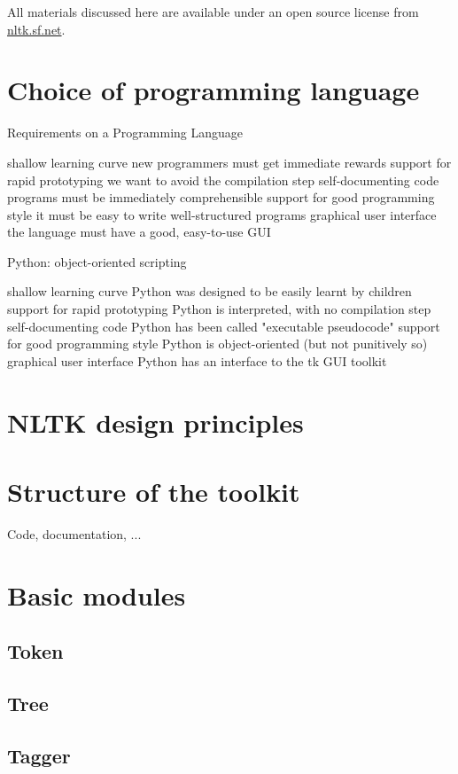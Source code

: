 \documentclass[11pt]{article}
\begin{document}
All materials discussed here are available under an open
source license from \url{nltk.sf.net}.

\section{Choice of programming language}

Requirements on a Programming Language

shallow learning curve
new programmers must get immediate rewards
support for rapid prototyping
we want to avoid the compilation step
self-documenting code
programs must be immediately comprehensible
support for good programming style
it must be easy to write well-structured programs
graphical user interface
the language must have a good, easy-to-use GUI

Python: object-oriented scripting

shallow learning curve
Python was designed to be easily learnt by children
support for rapid prototyping
Python is interpreted, with no compilation step
self-documenting code
Python has been called "executable pseudocode"
support for good programming style
Python is object-oriented (but not punitively so)
graphical user interface
Python has an interface to the tk GUI toolkit

\section{NLTK design principles}


\section{Structure of the toolkit}

Code, documentation, ...

\section{Basic modules}

\subsection{Token}

\subsection{Tree}

\subsection{Tagger}
\end{document}
